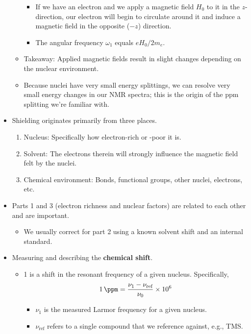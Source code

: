 \documentclass[../notes.tex]{subfiles}
\begin{document}
\begin{itemize}
\begin{itemize}
\begin{itemize}
            \item If we have an electron and we apply a magnetic field $H_0$ to it in the $z$-direction, our electron will begin to circulate around it and induce a magnetic field in the opposite ($-z$) direction.
            \item The angular frequency $\omega_1$ equals $eH_0/2m_e$.
        \end{itemize}
        \item Takeaway: Applied magnetic fields result in slight changes depending on the nuclear environment.
        \item Because nuclei have very small energy splittings, we can resolve very small energy changes in our NMR spectra; this is the origin of the ppm splitting we're familiar with.
    \end{itemize}
    \item Shielding originates primarily from three places.
    \begin{enumerate}
        \item Nucleus: Specifically how electron-rich or -poor it is.
        \item Solvent: The electrons therein will strongly influence the magnetic field felt by the nuclei.
        \item Chemical environment: Bonds, functional groups, other nuclei, electrons, etc.
    \end{enumerate}
    \item Parts 1 and 3 (electron richness and nuclear factors) are related to each other and are important.
    \begin{itemize}
        \item We usually correct for part 2 using a known solvent shift and an internal standard.
    \end{itemize}
    \item Measuring and describing the \textbf{chemical shift}.
    \begin{itemize}
        \item \SI{1}{\ppm} is a shift in the resonant frequency of a given nucleus. Specifically,
        \begin{equation*}
            \SI{1}{\ppm} = \frac{\nu_1-\nu_\text{ref}}{\nu_0}\times\num{e6}
        \end{equation*}
        \begin{itemize}
            \item $\nu_1$ is the measured Larmor frequency for a given nucleus.
            \item $\nu_\text{ref}$ refers to a single compound that we reference against, e.g., TMS.

\end{itemize}
\end{itemize}
\end{itemize}
\end{document}
